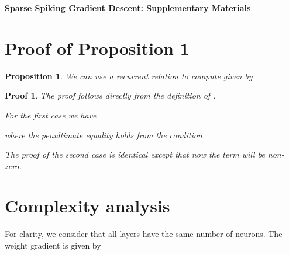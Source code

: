 \documentclass{article}
\newtheorem{proposition}{Proposition}
\newtheorem*{proof*}{Proof}
\begin{document}
\newpage
\appendix

\begin{center}
{\huge \textbf{Sparse Spiking Gradient Descent: Supplementary Materials}}
\end{center}
\bigskip

\section{Proof of Proposition 1} \label{supp:proof1}

\setcounter{proposition}{0}


\begin{proposition}
We can use a recurrent relation to compute  given by 

\end{proposition}

\begin{proof*}

The proof follows directly from the definition of .

For the first case we have



where the penultimate equality holds from the condition 

The proof of the second case is identical except that now the term  will be non-zero.
\end{proof*}

\section{Complexity analysis} \label{supp:compl_analysis}

For clarity, we consider that all layers have the same number  of neurons. The weight gradient is given by
\end{document}
